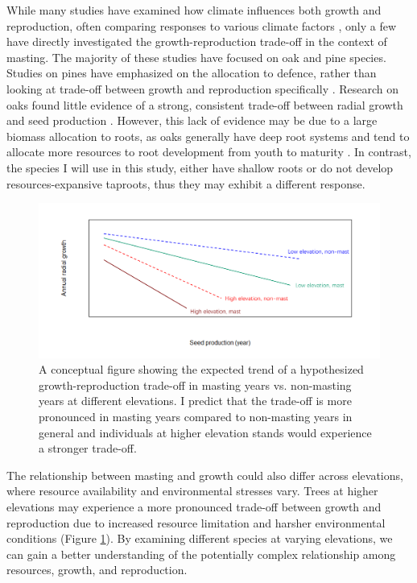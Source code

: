 \documentclass[11pt,letter]{article}
\begin{document}
While many studies have examined how climate influences both growth and reproduction, often comparing responses to various climate factors \citep{bajocco2021characterizing, koenig2020can, redmond2019resource, sanchez2011trade}, only a few have directly investigated the growth-reproduction trade-off in the context of masting. The majority of these studies have focused on oak and pine species. Studies on pines have emphasized on the allocation to defence, rather than looking at trade-off between growth and reproduction specifically \citep{larrinaga2024resource, redmond2019resource}. Research on oaks found little evidence of a strong, consistent trade-off between radial growth and seed production \citep{koenig2020can, patterson2023acorn}. However, this lack of evidence may be due to a  large biomass allocation to roots, as oaks generally have deep root systems and tend to allocate more resources to root development from youth to maturity \citep{burns1990silvics}. In contrast, the species I will use in this study, either have shallow roots or do not develop resources-expansive taproots, thus they may exhibit a different response.

\begin{figure}[htb]
	\centering
	\includegraphics[width=1\linewidth]{conceptualFigureChap2.png}
	\caption{A conceptual figure showing the expected trend of a hypothesized growth-reproduction trade-off in masting years vs. non-masting years at different elevations. I predict that the trade-off is more pronounced in masting years compared to non-masting years in general and individuals at higher elevation stands would experience a stronger trade-off.}
	\label{fig:conceptual2}
\end{figure}
The relationship between masting and growth could also differ across elevations, where resource availability and environmental stresses vary. Trees at higher elevations may experience a more pronounced trade-off between growth and reproduction due to increased resource limitation and harsher environmental conditions (Figure \ref{fig:conceptual2}). By examining different species at varying elevations, we can gain a better understanding of the potentially complex relationship among resources, growth, and reproduction.
\end{document}
